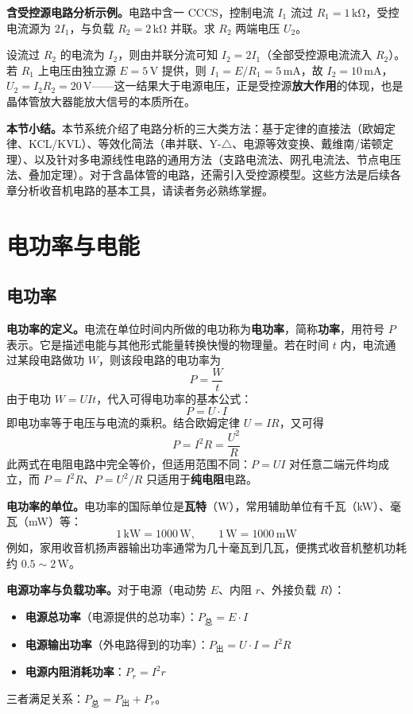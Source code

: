 \documentclass[12pt,UTF8]{ctexbook}
\begin{document}
\textbf{含受控源电路分析示例。}电路中含一 CCCS，控制电流 $I_1$ 流过 $R_1 = 1\,\mathrm{k\Omega}$，受控电流源为 $2 I_1$，与负载 $R_2 = 2\,\mathrm{k\Omega}$ 并联。求 $R_2$ 两端电压 $U_2$。

设流过 $R_2$ 的电流为 $I_2$，则由并联分流可知 $I_2 = 2 I_1$（全部受控源电流流入 $R_2$）。若 $R_1$ 上电压由独立源 $E = 5\,\mathrm{V}$ 提供，则 $I_1 = E / R_1 = 5\,\mathrm{mA}$，故 $I_2 = 10\,\mathrm{mA}$，$U_2 = I_2 R_2 = 20\,\mathrm{V}$——这一结果大于电源电压，正是受控源\textbf{放大作用}的体现，也是晶体管放大器能放大信号的本质所在。

\textbf{本节小结。}本节系统介绍了电路分析的三大类方法：基于定律的直接法（欧姆定律、KCL/KVL）、等效化简法（串并联、Y-$\triangle$、电源等效变换、戴维南/诺顿定理）、以及针对多电源线性电路的通用方法（支路电流法、网孔电流法、节点电压法、叠加定理）。对于含晶体管的电路，还需引入受控源模型。这些方法是后续各章分析收音机电路的基本工具，请读者务必熟练掌握。

\section{电功率与电能}
\label{sec:power_energy}

\subsection{电功率}

\textbf{电功率的定义。}电流在单位时间内所做的电功称为\textbf{电功率}，简称\textbf{功率}，用符号 $P$ 表示。它是描述电能与其他形式能量转换快慢的物理量。若在时间 $t$ 内，电流通过某段电路做功 $W$，则该段电路的电功率为
\[
P = \frac{W}{t}
\]
由于电功 $W = U I t$，代入可得电功率的基本公式：
\[
P = U \cdot I
\]
即电功率等于电压与电流的乘积。结合欧姆定律 $U = IR$，又可得
\[
P = I^2 R = \frac{U^2}{R}
\]
此两式在电阻电路中完全等价，但适用范围不同：$P=UI$ 对任意二端元件均成立，而 $P=I^2R$、$P=U^2/R$ 只适用于\textbf{纯电阻}电路。

\textbf{电功率的单位。}电功率的国际单位是\textbf{瓦特}（W），常用辅助单位有千瓦（kW）、毫瓦（mW）等：
\[
1\,\mathrm{kW} = 1000\,\mathrm{W}, \qquad 1\,\mathrm{W} = 1000\,\mathrm{mW}
\]
例如，家用收音机扬声器输出功率通常为几十毫瓦到几瓦，便携式收音机整机功耗约 $0.5\sim2\,\mathrm{W}$。

\textbf{电源功率与负载功率。}对于电源（电动势 $E$、内阻 $r$、外接负载 $R$）：
\begin{itemize}
  \item \textbf{电源总功率}（电源提供的总功率）：$P_{\text{总}} = E \cdot I$
  \item \textbf{电源输出功率}（外电路得到的功率）：$P_{\text{出}} = U \cdot I = I^2 R$
  \item \textbf{电源内阻消耗功率}：$P_r = I^2 r$
\end{itemize}
三者满足关系：$P_{\text{总}} = P_{\text{出}} + P_r$。
\end{document}
